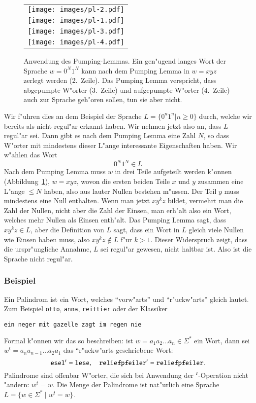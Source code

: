 \begin{figure}[H]
\begin{center}
\begin{tabular}{l}
\texttt{[image: images/pl-2.pdf]}\\
\texttt{[image: images/pl-1.pdf]}\\
\texttt{[image: images/pl-3.pdf]}\\
\texttt{[image: images/pl-4.pdf]}
\end{tabular}
\end{center}
\caption{Anwendung des Pumping-Lemmas. Ein gen"ugend langes Wort
der Sprache $w=0^N1^N$ kann nach dem Pumping Lemma in $w=xyz$ 
zerlegt werden (2.~Zeile). Das Pumping Lemma verspricht, dass
abgepumpte W"orter (3.~Zeile) und aufgepumpte W"orter (4.~Zeile)
auch zur Sprache geh"oren sollen, tun sie aber nicht.
\label{plimage}}
\end{figure}

\begin{beispiel}
Wir f"uhren dies an dem Beispiel der Sprache $L=\{0^n1^n|n\ge 0\}$
durch, welche wir bereits als nicht regul"ar erkannt haben. Wir nehmen
jetzt also an, dass $L$ regul"ar sei. Dann gibt es nach dem Pumping
Lemma eine Zahl $N$, so dass W"orter mit mindestens dieser L"ange
interessante Eigenschaften haben. Wir w"ahlen das Wort
\[
0^N1^N\in L
\]
Nach dem Pumping Lemma muss $w$ in drei Teile aufgeteilt werden k"onnen
(Abbildung~\ref{plimage}),
$w=xyz$,
wovon die ersten beiden Teile $x$ und $y$ zusammen eine L"ange $\le N$
haben, also aus lauter Nullen bestehen m"ussen. Der Teil $y$ muss
mindestens eine Null enthalten. Wenn man jetzt $xy^kz$ bildet, vermehrt
man die Zahl der Nullen, nicht aber die Zahl der Einsen, man erh"alt
also ein Wort, welches mehr Nullen als Einsen enth"alt. Das Pumping
Lemma sagt, dass $xy^kz\in L$, aber die Definition von $L$ sagt,
dass ein Wort in $L$ gleich viele Nullen wie Einsen haben muss, also
$xy^kz\not\in L$ f"ur $k>1$. Dieser Widerspruch zeigt, dass die urspr"ungliche
Annahme, $L$ sei regul"ar gewesen, nicht haltbar ist. Also ist
die Sprache nicht regul"ar.
\end{beispiel}

\subsubsection{Beispiel}
Ein Palindrom ist ein Wort, welches ``vorw"arts'' und ``r"uckw"arts''
gleich lautet. Zum Beispiel {\tt otto}, {\tt anna}, {\tt reittier} oder der
Klassiker
\begin{center}
{\tt ein neger mit gazelle zagt im regen nie}
\end{center}
Formal k"onnen wir das so beschreiben: ist $w=a_1a_2\dots a_n\in\Sigma^*$
ein Wort, dann sei $w^t=a_na_{n-1}\dots a_2a_1$ das ``r"uckw"arts
geschriebene Wort:
\[
{\tt esel}^t={\tt lese},\quad {\tt reliefpfeiler}^t={\tt reliefpfeiler}.
\]
Palindrome sind offenbar W"orter, die sich bei Anwendung der
$\mathstrut^t$-Operation nicht "andern: $w^t=w$. Die Menge der Palindrome
ist nat"urlich eine Sprache $L=\{w\in\Sigma^*\;|\;w^t=w\}$. 

